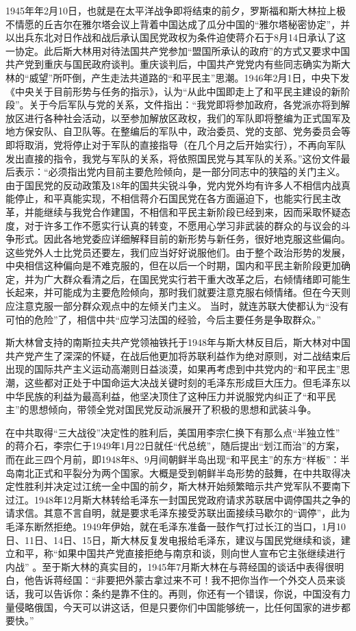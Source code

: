 \documentclass[UTF8, 12pt, a4paper]{ctexrep}
\begin{document}
1945年年2月10日，也就是在太平洋战争即将结束的前夕，罗斯福和斯大林拉上极不情愿的丘吉尔在雅尔塔会议上背着中国达成了瓜分中国的“雅尔塔秘密协定”，并以出兵东北对日作战和战后承认国民党政权为条件迫使蒋介石于8月14日承认了这一协定。此后斯大林用对待法国共产党参加“盟国所承认的政府”的方式又要求中国共产党到重庆与国民政府谈判。重庆谈判后，中国共产党党内有些同志确实为斯大林的“威望”所吓倒，产生走法共道路的“和平民主”思潮。1946年2月1日，中央下发《中央关于目前形势与任务的指示》，认为“从此中国即走上了和平民主建设的新阶段”。关于今后军队与党的关系，文件指出：“我党即将参加政府，各党派亦将到解放区进行各种社会活动，以至参加解放区政权，我们的军队即将整编为正式国军及地方保安队、自卫队等。在整编后的军队中，政治委员、党的支部、党务委员会等即将取消，党将停止对于军队的直接指导（在几个月之后开始实行），不再向军队发出直接的指令，我党与军队的关系，将依照国民党与其军队的关系。”这份文件最后表示：“必须指出党内目前主要危险倾向，是一部分同志中的狭隘的关门主义。由于国民党的反动政策及18年的国共尖锐斗争，党内党外均有许多人不相信内战真能停止，和平真能实现，不相信蒋介石国民党在各方面逼迫下，也能实行民主改革，并能继续与我党合作建国，不相信和平民主新阶段已经到来，因而采取怀疑态度，对于许多工作不愿实行认真的转变，不愿用心学习非武装的群众的与议会的斗争形式。因此各地党委应详细解释目前的新形势与新任务，很好地克服这些偏向。这些党外人士比党员还要左，我们应当好好说服他们。由于整个政治形势的发展，中央相信这种偏向是不难克服的，但在以后一个时期，国内和平民主新阶段更加确定，并为广大群众看清之后，在国民党实行若干重大改革之后，右倾情绪即可能生长起来，并可能成为主要危险倾向，那时我们就要注意克服右倾情绪。但在今天则应注意克服一部分群众观点中的左倾关门主义。 当时，就连苏联大使都认为“没有可怕的危险”了，相信中共“应学习法国的经验，今后主要任务是争取群众。”

斯大林曾支持的南斯拉夫共产党领袖铁托于1948年与斯大林反目后，斯大林对中国共产党产生了深深的怀疑，在战后他更加将苏联利益作为绝对原则，对二战结束后出现的国际共产主义运动高潮则日益淡漠，如果再考虑到中共党内的“和平民主”思潮，这些都对正处于中国命运大决战关键时刻的毛泽东形成巨大压力。但毛泽东以中华民族的利益为最高利益，他坚决顶住了这种压力并说服党内纠正了“和平民主”的思想倾向，带领全党对国民党反动派展开了积极的思想和武装斗争。

在中共取得“三大战役”决定性的胜利后，美国用李宗仁换下有那么点“半独立性” 的蒋介石，李宗仁于1949年1月22日就任“代总统”，随后提出“划江而治”的方案，而在此三四个月前，即1948年8、9月间朝鲜半岛出现“和平民主”的东方“样板”：半岛南北正式和平裂分为两个国家。大概是受到朝鲜半岛形势的鼓舞，在中共取得决定性胜利并决定过江统一全中国的前夕，斯大林开始频繁暗示共产党军队不要南下过江。1948年12月斯大林转给毛泽东一封国民党政府请求苏联居中调停国共之争的请求信。其意不言自明，就是要求毛泽东接受苏联出面接续马歇尔的“调停”，此为毛泽东断然拒绝。1949年伊始，就在毛泽东准备一鼓作气打过长江的当口，1月10日、11日、14日、15日，斯大林反复发电报给毛泽东，建议与国民党继续和谈，建立和平，称“如果中国共产党直接拒绝与南京和谈，则向世人宣布它主张继续进行内战” 。至于斯大林的真实目的，1945年7月斯大林在与蒋经国的谈话中表得很明白，他告诉蒋经国：“非要把外蒙古拿过来不可！我不把你当作一个外交人员来谈话，我可以告诉你：条约是靠不住的。再则，你还有一个错误，你说，中国没有力量侵略俄国，今天可以讲这话，但是只要你们中国能够统一，比任何国家的进步都要快。”
\end{document}
